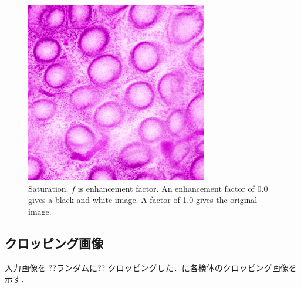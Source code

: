\begin{figure}[H]
\begin{minipage}{0.25\columnwidth}
	\end{minipage}
	\begin{minipage}{0.25\columnwidth}
		\centering
		\includegraphics[clip, width=\linewidth]{fig/preprocessing/data_aug/color/SATURATION/SATURATION_1_50}
	\end{minipage}	
	
	\caption{Saturation. $f$ is enhancement factor. An enhancement factor of 0.0 gives a black and white image. A factor of 1.0 gives the original image.}
	\label{fig:彩度}
	
\end{figure}

\subsection{クロッピング画像}
入力画像を
??ランダムに??
クロッピングした．に各検体のクロッピング画像を示す．

